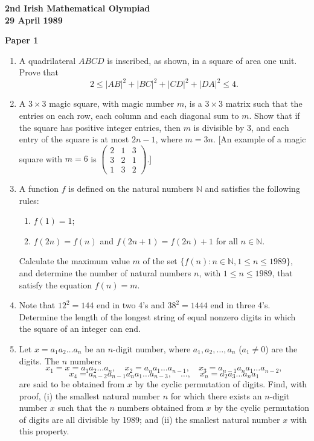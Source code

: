 \documentclass[12pt]{article}
\begin{document}
\begin{center}
{\large\bfseries 2nd Irish Mathematical Olympiad\\
29 April 1989}
\end{center}

\bigskip
\noindent\textbf{Paper 1}
\bigskip

\begin{enumerate}
\item A quadrilateral $ABCD$ is inscribed, as shown, in a square of area one unit. Prove that \[2 \le |AB|^2 + |BC|^2 + |CD|^2 + |DA|^2 \le 4.\]

\item A $3 \times 3$ magic square, with magic number $m$, is a $3 \times 3$ matrix such that the entries on each row, each column and each diagonal sum to $m$. Show that if the square has positive integer entries, then $m$ is divisible by 3, and each entry of the square is at most $2n - 1$, where $m = 3n$. [An example of a magic square with $m = 6$ is $\begin{pmatrix} 2 & 1 & 3 \\ 3 & 2 & 1 \\ 1 & 3 & 2 \end{pmatrix}$.]

\item A function $f$ is defined on the natural numbers $\mathbb{N}$ and satisfies the following rules: \begin{enumerate} \item[(a)] $f(1) = 1$; \item[(b)] $f(2n) = f(n)$ and $f(2n+1) = f(2n) + 1$ for all $n \in \mathbb{N}$. \end{enumerate} Calculate the maximum value $m$ of the set $\{f(n) : n \in \mathbb{N}, 1 \le n \le 1989\}$, and determine the number of natural numbers $n$, with $1 \le n \le 1989$, that satisfy the equation $f(n) = m$.

\item Note that $12^2 = 144$ end in two 4's and $38^2 = 1444$ end in three 4's. Determine the length of the longest string of equal nonzero digits in which the square of an integer can end.

\item Let $x = a_1a_2\ldots a_n$ be an $n$-digit number, where $a_1, a_2, \ldots, a_n$ ($a_1 \ne 0$) are the digits. The $n$ numbers \[x_1 = x = a_1a_2\ldots a_n, \quad x_2 = a_na_1\ldots a_{n-1}, \quad x_3 = a_{n-1}a_na_1\ldots a_{n-2},\] \[x_4 = a_{n-2}a_{n-1}a_na_1\ldots a_{n-3}, \quad \ldots, \quad x_n = a_2a_3\ldots a_na_1\] are said to be obtained from $x$ by the cyclic permutation of digits. Find, with proof, (i) the smallest natural number $n$ for which there exists an $n$-digit number $x$ such that the $n$ numbers obtained from $x$ by the cyclic permutation of digits are all divisible by 1989; and (ii) the smallest natural number $x$ with this property.

\end{enumerate}
\end{document}
